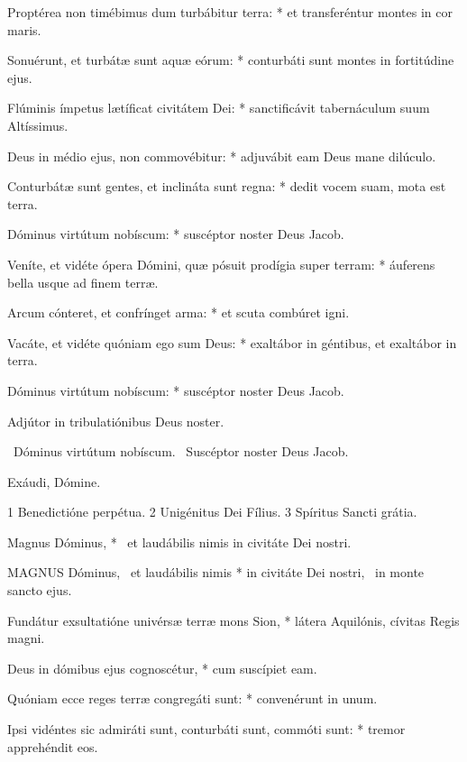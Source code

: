 Proptérea non timébimus dum turbábitur terra: * et transferéntur montes in cor maris.

Sonuérunt, et turbátæ sunt aquæ eórum: * conturbáti sunt montes in fortitúdine ejus.

Flúminis ímpetus lætíficat civitátem Dei: * sanctificávit tabernáculum suum Altíssimus.

Deus in médio ejus, non commovébitur: * adjuvábit eam Deus mane dilúculo.

Conturbátæ sunt gentes, et inclináta sunt regna: * dedit vocem suam, mota est terra.

Dóminus virtútum nobíscum: * suscéptor noster Deus Jacob.

Veníte, et vidéte ópera Dómini, quæ pósuit prodígia super terram: * áuferens bella usque ad finem terræ.

Arcum cónteret, et confrínget arma: * et scuta combúret igni.

Vacáte, et vidéte quóniam ego sum Deus: * exaltábor in géntibus, et exaltábor in terra.

Dóminus virtútum nobíscum: * suscéptor noster Deus Jacob.

 Adjútor in tribulatiónibus Deus noster.


\V\ Dóminus virtútum nobíscum. \R\ Suscéptor noster Deus Jacob.

 Exáudi, Dómine.

 1 Benedictióne perpétua. 2 Unigénitus Dei Fílius. 3 Spíritus Sancti grátia.


 Magnus Dóminus, * \textdagger\ et laudábilis nimis in civitáte Dei nostri. \textdaggerdbl


\lettrine[lines=2]{M}{AGNUS} Dóminus, \textdagger\ et laudábilis nimis * in civitáte Dei nostri, \textdaggerdbl\ in monte sancto ejus.

Fundátur exsultatióne univérsæ terræ mons Sion, * látera Aquilónis, cívitas Regis magni.

Deus in dómibus ejus cognoscétur, * cum suscípiet eam.

Quóniam ecce reges terræ congregáti sunt: * convenérunt in unum.

Ipsi vidéntes sic admiráti sunt, conturbáti sunt, commóti sunt: * tremor apprehéndit eos.

